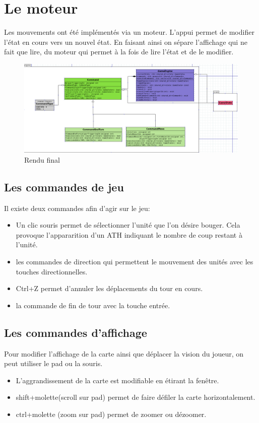 \newpage





\section{Le moteur}

Les mouvements ont été implémentés via un moteur. L'appui permet de modifier l'état en cours vers un nouvel état. En faisant ainsi on sépare l'affichage qui ne fait que lire, du moteur qui permet à la fois de lire l'état et de le modifier.


\begin{figure}[h]
    \centering
    \includegraphics[scale =0.25]{images/engine.png}
    \caption{Rendu final}
    \label{fig:Advance Wars}
\end{figure}

\subsection{Les commandes de jeu}

Il existe deux commandes afin d'agir sur le jeu: 
\begin{itemize}
    \item Un clic souris permet de sélectionner l'unité que l'on désire bouger. Cela provoque l'appararition d'un ATH indiquant le nombre de coup restant à l'unité.
    \item les commandes de direction qui permettent le mouvement des unités avec les touches directionnelles.
    \item Ctrl+Z permet d'annuler les déplacements du tour en cours.
    \item la commande de fin de tour avec la touche entrée.
\end{itemize}

\subsection{Les commandes d'affichage}
Pour modifier l'affichage de la carte ainsi que déplacer la vision du joueur, on peut utiliser le pad ou la souris.
\begin{itemize}
    \item L'aggrandissement de la carte est modifiable en étirant la fenêtre.
    \item shift+molette(scroll sur pad) permet de faire défiler la carte horizontalement.
    \item ctrl+molette (zoom sur pad) permet de zoomer ou dézoomer.
\end{itemize}


